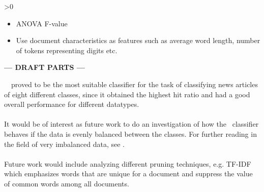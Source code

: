 \ifnum\printdraft>0
	\begin{itemize}
		\item ANOVA F-value
		\item Use document characteristics as features such as average word length, number of tokens representing digits etc.
	\end{itemize}
\else
\begin{center}
	\textbf{--- DRAFT PARTS ---}
\end{center}
\fi
\mn\ \nb\ proved to be the most suitable classifier for the task of classifying news articles of eight different classes, since it obtained the highest hit ratio and had a good overall performance for different datatypes.
\\\\
It would be of interest as future work to do an investigation of how the \rf\ classifier behaves if the data is evenly balanced between the classes. For further reading in the field of very imbalanced data, see \cite{Chen}.
\\\\
Future work would include analyzing different pruning techniques, e.g. TF-IDF which emphasizes words that are unique for a document and suppress the value of common words among all documents. 
